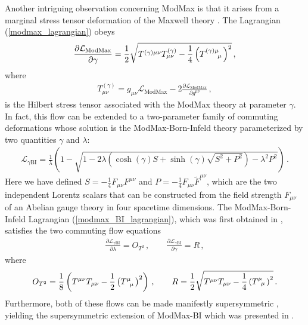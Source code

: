 \documentclass[12pt]{article}
\numberwithin{equation}{section}
\begin{document}
Another intriguing observation concerning ModMax is that it arises from a marginal stress tensor deformation of the Maxwell theory \cite{Babaei-Aghbolagh:2022uij,Ferko:2022iru,Conti:2022egv,Ferko:2023ruw}. The Lagrangian (\ref{modmax_lagrangian}) obeys
%
\begin{align}\label{modmax_flow_eqn}
    \frac{\partial \mathcal{L}_{\text{ModMax}}}{\partial \gamma} = \frac{1}{2} \sqrt{ T^{(\gamma) \mu \nu} T_{\mu \nu}^{(\gamma)} - \frac{1}{4} \left( \tensor{T}{^{(\gamma)}^\mu_\mu} \right)^2 } \, , 
\end{align}
%
where
%
\begin{align}
    T_{\mu \nu}^{(\gamma)} = g_{\mu \nu} \mathcal{L}_{\text{ModMax}} - 2 \frac{\partial \mathcal{L}_{\text{ModMax}}}{\partial g^{\mu \nu}} \, , 
\end{align}
%
is the Hilbert stress tensor associated with the ModMax theory at parameter $\gamma$. 
%
In fact, this flow can be extended to a two-parameter family of commuting deformations whose solution is the ModMax-Born-Infeld theory parameterized by two quantities $\gamma$ and $\lambda$:
%
\begin{align}\label{modmax_BI_lagrangian}
    \mathcal{L}_{\gamma\text{BI}} = \frac{1}{\lambda} \left( 1 - \sqrt{ 1 - 2 \lambda \left( \cosh ( \gamma ) S + \sinh ( \gamma ) \sqrt{S^2 + P^2} \right) - \lambda^2 P^2 } \right) \, .
\end{align}
%
Here we have defined $S = - \frac{1}{4} F_{\mu \nu} F^{\mu \nu}$ and $P = - \frac{1}{4} F_{\mu \nu} \widetilde{F}^{\mu \nu}$, which are the two independent Lorentz scalars that can be constructed from the field strength $F_{\mu \nu}$ of an Abelian gauge theory in four spacetime dimensions. The ModMax-Born-Infeld Lagrangian (\ref{modmax_BI_lagrangian}), which was first obtained in \cite{Bandos:2020hgy}, satisfies the two commuting flow equations \cite{Conti:2018jho,Babaei-Aghbolagh:2022uij,Ferko:2022iru,Conti:2022egv,Ferko:2023ruw}
%
\begin{align}\label{ModMax_BI_two_commuting_flows}
    \frac{\partial \mathcal{L}_{\gamma \text{BI}}}{\partial \lambda} = O_{T^2} \, , \qquad \frac{\partial \mathcal{L}_{\gamma \text{BI}} }{\partial \gamma} = R \, ,
\end{align}
%
where
%
\begin{align}
    O_{T^2} = \frac{1}{8} \left( T^{\mu \nu} T_{\mu \nu} - \frac{1}{2} \left( \tensor{T}{^\mu_\mu} \right)^2 \right) \, , \qquad R = \frac{1}{2} \sqrt{ T^{\mu \nu} T_{\mu \nu} - \frac{1}{4} \left( \tensor{T}{^\mu_\mu} \right)^2 } \, .
\end{align}
%
Furthermore, both of these flows can be made manifestly supersymmetric \cite{Ferko:2022iru,Ferko:2023ruw}, yielding the supersymmetric extension of ModMax-BI which was presented in \cite{Lechner:2022qhb}.
\end{document}

